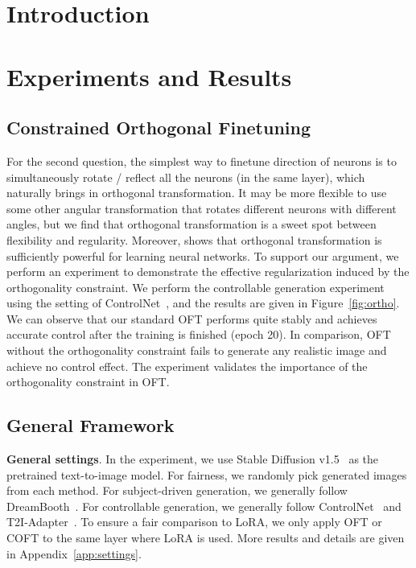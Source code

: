 \section{Introduction}

\section{Experiments and Results}

\subsection{Constrained Orthogonal Finetuning}

For the second question, the simplest way to finetune direction of neurons is to simultaneously rotate / reflect all the neurons (in the same layer), which naturally brings in orthogonal transformation. It may be more flexible to use some other angular transformation that rotates different neurons with different angles, but we find that orthogonal transformation is a sweet spot between flexibility and regularity. Moreover, \cite{liu2021orthogonal} shows that orthogonal transformation is sufficiently powerful for learning neural networks. To support our argument, we perform an experiment to demonstrate the effective regularization induced by the orthogonality constraint. We perform the controllable generation experiment using the setting of ControlNet~\cite{zhang2023adding}, and the results are given in Figure~\ref{fig:ortho}. We can observe that our standard OFT performs quite stably and achieves accurate control after the training is finished (epoch 20). In comparison, OFT without the orthogonality constraint fails to generate any realistic image and achieve no control effect. The experiment validates the importance of the orthogonality constraint in OFT.

\subsection{General Framework}

\textbf{General settings}. In the experiment, we use Stable Diffusion v1.5~\cite{rombach2022high} as the pretrained text-to-image model. For fairness, we randomly pick generated images from each method. For subject-driven generation, we generally follow DreamBooth~\cite{ruiz2023dreambooth}. For controllable generation, we generally follow  ControlNet~\cite{zhang2023adding} and T2I-Adapter~\cite{mou2023t2i}. To ensure a fair comparison to LoRA, we only apply OFT or COFT to the same layer where LoRA is used. More results and details are given in Appendix~\ref{app:settings}.

